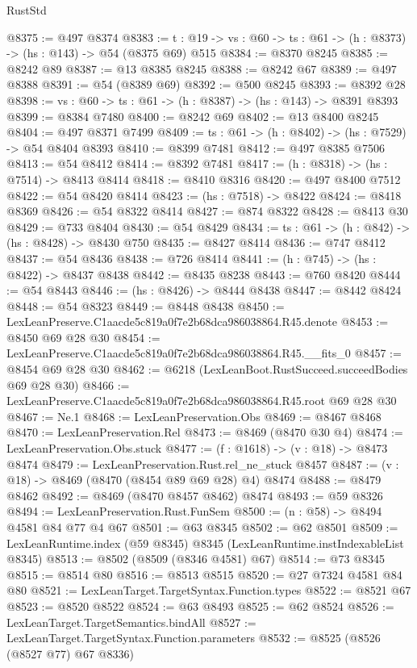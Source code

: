 \begin{lexlean}{RustStd}
\begin{coremodule}
@8375 := @497 @8374
@8383 := {t : @19} -> {vs : @60} -> {ts : @61} -> (h : @8373) -> (hs : @143) -> @54 (@8375 @69) @515
@8384 := @8370 @8245
@8385 := @8242 @89
@8387 := @13 @8385 @8245
@8388 := @8242 @67
@8389 := @497 @8388
@8391 := @54 (@8389 @69)
@8392 := @500 @8245
@8393 := @8392 @28
@8398 := {vs : @60} -> {ts : @61} -> (h : @8387) -> (hs : @143) -> @8391 @8393
@8399 := @8384 @7480
@8400 := @8242 @69
@8402 := @13 @8400 @8245
@8404 := @497 @8371 @7499
@8409 := {ts : @61} -> (h : @8402) -> (hs : @7529) -> @54 @8404 @8393
@8410 := @8399 @7481
@8412 := @497 @8385 @7506
@8413 := @54 @8412
@8414 := @8392 @7481
@8417 := (h : @8318) -> (hs : @7514) -> @8413 @8414
@8418 := @8410 @8316
@8420 := @497 @8400 @7512
@8422 := @54 @8420 @8414
@8423 := (hs : @7518) -> @8422
@8424 := @8418 @8369
@8426 := @54 @8322 @8414
@8427 := @874 @8322
@8428 := @8413 @30
@8429 := @733 @8404
@8430 := @54 @8429
@8434 := {ts : @61} -> (h : @842) -> (hs : @8428) -> @8430 @750
@8435 := @8427 @8414
@8436 := @747 @8412
@8437 := @54 @8436
@8438 := @726 @8414
@8441 := (h : @745) -> (hs : @8422) -> @8437 @8438
@8442 := @8435 @8238
@8443 := @760 @8420
@8444 := @54 @8443
@8446 := (hs : @8426) -> @8444 @8438
@8447 := @8442 @8424
@8448 := @54 @8323
@8449 := @8448 @8438
@8450 := LexLeanPreserve.C1aacde5c819a0f7e2b68dca986038864.R45.denote
@8453 := @8450 @69 @28 @30
@8454 := LexLeanPreserve.C1aacde5c819a0f7e2b68dca986038864.R45.__fits_0
@8457 := @8454 @69 @28 @30
@8462 := @6218 (LexLeanBoot.RustSucceed.succeedBodies @69 @28 @30)
@8466 := LexLeanPreserve.C1aacde5c819a0f7e2b68dca986038864.R45.root @69 @28 @30
@8467 := Ne.{1}
@8468 := LexLeanPreservation.Obs
@8469 := @8467 @8468
@8470 := LexLeanPreservation.Rel
@8473 := @8469 (@8470 @30 @4)
@8474 := LexLeanPreservation.Obs.stuck
@8477 := (f : @1618) -> (v : @18) -> @8473 @8474
@8479 := LexLeanPreservation.Rust.rel_ne_stuck @8457
@8487 := (v : @18) -> @8469 (@8470 (@8454 @89 @69 @28) @4) @8474
@8488 := @8479 @8462
@8492 := @8469 (@8470 @8457 @8462) @8474
@8493 := @59 @8326
@8494 := LexLeanPreservation.Rust.FunSem
@8500 := (n : @58) -> @8494 @4581 @84 @77 @4 @67
@8501 := @63 @8345
@8502 := @62 @8501
@8509 := LexLeanRuntime.index (@59 @8345) @8345 (LexLeanRuntime.instIndexableList @8345)
@8513 := @8502 (@8509 (@8346 @4581) @67)
@8514 := @73 @8345
@8515 := @8514 @80
@8516 := @8513 @8515
@8520 := @27 @7324 @4581 @84 @80
@8521 := LexLeanTarget.TargetSyntax.Function.types
@8522 := @8521 @67
@8523 := @8520 @8522
@8524 := @63 @8493
@8525 := @62 @8524
@8526 := LexLeanTarget.TargetSemantics.bindAll
@8527 := LexLeanTarget.TargetSyntax.Function.parameters
@8532 := @8525 (@8526 (@8527 @77) @67 @8336)

\end{coremodule}
\end{lexlean}
